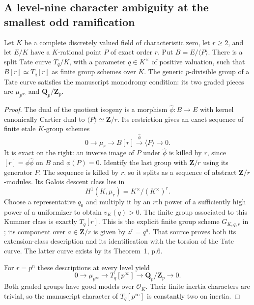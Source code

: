 \subsection{A level-nine character ambiguity at the smallest odd ramification}

\begin{lemma}
\label{lem:B-RD29-isogeny-Tate}
Let $K$ be a complete discretely valued field of characteristic zero,
let $r\geq2$, and let $E/K$ have a $K$-rational point $P$ of exact
order $r$. Put $B=E/\langle P\rangle$. There is a split Tate curve
$T_q/K$, with a parameter $q\in K^\times$ of positive valuation,
such that $B[r]\simeq T_q[r]$ as finite group schemes over $K$.
The generic $p$-divisible group of a Tate curve satisfies the
manuscript monodromy condition: its two graded pieces are
$\mu_{p^\infty}$ and $\mathbf Q_p/\mathbf Z_p$.
\end{lemma}
\begin{proof}
The dual of the quotient isogeny is a morphism
$\widehat\phi:B\to E$ with kernel canonically Cartier dual to
$\langle P\rangle\simeq\mathbf Z/r$. Its restriction gives an
exact sequence of finite etale $K$-group schemes
\[
 0\longrightarrow\mu_r\longrightarrow B[r]
   \xrightarrow{\widehat\phi}\langle P\rangle
   \longrightarrow0.                                      \tag{B-RD29.1}
\]
It is exact on the right: an inverse image of $P$ under
$\widehat\phi$ is killed by $r$, since
$[r]=\phi\widehat\phi$ on $B$ and $\phi(P)=0$.
Identify the last group with $\mathbf Z/r$ using its generator $P$.
The sequence is killed by $r$, so it splits as a sequence of
abstract $\mathbf Z/r$-modules. Its Galois descent class lies in
\[
 H^1(K,\mu_r)=K^\times/(K^\times)^r.
\]
Choose a representative $q_0$ and multiply it by an $r$th power
of a sufficiently high power of a uniformizer to obtain $v_K(q)>0$.
The finite group associated to this Kummer class is exactly
$T_q[r]$. This is the explicit finite group scheme
$G_{K,q,r}$ in \cite[``Points of finite order'', pp.18--19]{Tate1995Uniformization};
its component over $a\in\mathbf Z/r$ is given by $z^r=q^a$.
That source proves both its extension-class description and its
identification with the torsion of the Tate curve. The latter
curve exists by its Theorem~1, p.6.

For $r=p^n$ these descriptions at every level yield
\[
 0\longrightarrow\mu_{p^\infty}\longrightarrow T_q[p^\infty]
   \longrightarrow\mathbf Q_p/\mathbf Z_p\longrightarrow0.
\]
Both graded groups have good models over $\mathcal O_K$.
Their finite inertia characters are trivial, so the manuscript
character of $T_q[p^\infty]$ is constantly two on inertia.
\end{proof}

